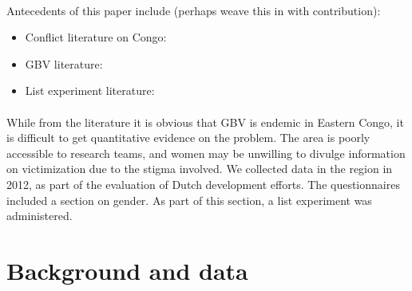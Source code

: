 \documentclass[11pt,a4paper]{scrartcl} %
\begin{document}
\paragraph{}
Antecedents of this paper include (perhaps weave this in with contribution):
\begin{itemize}
	\item Conflict literature on Congo:
	\item GBV literature:
	\item List experiment literature: 
\end{itemize}

\paragraph{}
While from the literature it is obvious that GBV is endemic in Eastern Congo, it is difficult to get quantitative evidence on the problem. The area is poorly accessible to research teams, and women may be unwilling to divulge information on victimization due to the stigma involved. We collected data in the region in 2012, as part of the evaluation of Dutch development efforts. The questionnaires included a section on gender. As part of this section, a list experiment was administered.

\paragraph{}


\section*{Background and data}
\end{document}
